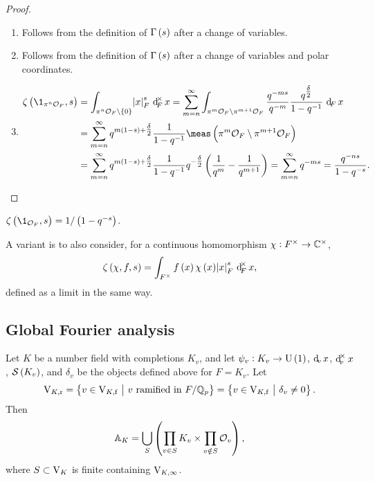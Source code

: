\begin{proof}
\hfill
\begin{enumerate}
\item Follows from the definition of $ \Gamma\br{s} $ after a change of variables.
\item Follows from the definition of $ \Gamma\br{s} $ after a change of variables and polar coordinates.
\item
\begin{align*}
\zeta\br{\1_{\pi^n\OOO_F}, s}
& = \intFX[\pi^n\OOO_F \setminus \cbr{0}]{\abs{x}_F^s}{x}
= \sum_{m = n}^\infty \intF[\pi^m\OOO_F \setminus \pi^{m + 1}\OOO_F]{\dfrac{q^{-ms}}{q^{-m}}\dfrac{q^{\tfrac{\delta}{2}}}{1 - q^{-1}}}{x} \\
& = \sum_{m = n}^\infty q^{m\br{1 - s} + \tfrac{\delta}{2}}\dfrac{1}{1 - q^{-1}}\meas\br{\pi^m\OOO_F \setminus \pi^{m + 1}\OOO_F} \\
& = \sum_{m = n}^\infty q^{m\br{1 - s} + \tfrac{\delta}{2}}\dfrac{1}{1 - q^{-1}}q^{-\tfrac{\delta}{2}}\br{\dfrac{1}{q^m} - \dfrac{1}{q^{m + 1}}}
= \sum_{m = n}^\infty q^{-ms}
= \dfrac{q^{-ns}}{1 - q^{-s}}.
\end{align*}
\end{enumerate}
\end{proof}

\pagebreak

\begin{example*}
$ \zeta\br{\1_{\OOO_F}, s} = 1 / \br{1 - q^{-s}} $.
\end{example*}

A variant is to also consider, for a continuous homomorphism $ \chi : F^\times \to \mathbb{C}^\times $,
$$ \zeta\br{\chi, f, s} = \intFX{f\br{x}\chi\br{x}\abs{x}_F^s}{x}, $$
defined as a limit in the same way.

\subsection{Global Fourier analysis}

Let $ K $ be a number field with completions $ K_v $, and let $ \psi_v : K_v \to \U\br{1} $, $ \dv x $, $ \dv^\times x $, $ \SSS\br{K_v} $, and $ \delta_v $ be the objects defined above for $ F = K_v $. Let
$$ \V_{K, \r} = \cbr{v \in \V_{K, \f} \st v \ \text{ramified in} \ F / \QQ_p} = \cbr{v \in \V_{K, \f} \st \delta_v \ne 0}. $$
Then
$$ \AA_K = \bigcup_S \br{\prod_{v \in S} K_v \times \prod_{v \notin S} \OOO_v}, $$
where $ S \subset \mathrm{V}_K $ is finite containing $ \mathrm{V}_{K, \infty} $.

